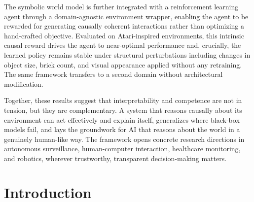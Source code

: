 \documentclass[12pt,a4paper]{report}
\begin{document}
The symbolic world model is further integrated with a reinforcement learning agent through a domain-agnostic environment wrapper, enabling the agent to be rewarded for generating causally coherent interactions rather than optimizing a hand-crafted objective. Evaluated on Atari-inspired environments, this intrinsic causal reward drives the agent to near-optimal performance and, crucially, the learned policy remains stable under structural perturbations including changes in object size, brick count, and visual appearance applied without any retraining. The same framework transfers to a second domain without architectural modification.

Together, these results suggest that interpretability and competence are not in tension, but they are complementary. A system that reasons causally about its environment can act effectively and explain itself, generalizes where black-box models fail, and lays the groundwork for AI that reasons about the world in a genuinely human-like way. The framework opens concrete research directions in autonomous surveillance, human-computer interaction, healthcare monitoring, and robotics, wherever trustworthy, transparent decision-making matters.




\tableofcontents
\newpage


\chapter{Introduction}
\end{document}
